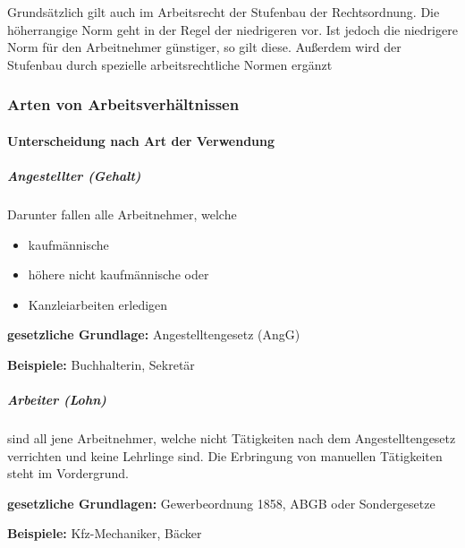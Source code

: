 \documentclass{htblagkr}
\begin{document}
    Grundsätzlich gilt auch im Arbeitsrecht der Stufenbau der Rechtsordnung.
    Die höherrangige Norm geht in der Regel der niedrigeren vor.
    Ist jedoch die niedrigere Norm für den Arbeitnehmer günstiger, so gilt diese.
    Außerdem wird der Stufenbau durch spezielle arbeitsrechtliche Normen ergänzt

    \subsubsection{Arten von Arbeitsverhältnissen}

    \paragraph{Unterscheidung nach Art der Verwendung}

    \subparagraph{Angestellter (Gehalt)}

    Darunter fallen alle Arbeitnehmer, welche

    \begin{itemize}
        \item{kaufmännische}
        \item{höhere nicht kaufmännische oder}
        \item{Kanzleiarbeiten erledigen}
    \end{itemize}

    \textbf{gesetzliche Grundlage:} Angestelltengesetz (AngG)

    \textbf{Beispiele:} Buchhalterin, Sekretär

    \subparagraph{Arbeiter (Lohn)}

    sind all jene Arbeitnehmer, welche nicht Tätigkeiten nach dem Angestelltengesetz verrichten und keine Lehrlinge sind.
    Die Erbringung von manuellen Tätigkeiten steht im Vordergrund.

    \textbf{gesetzliche Grundlagen:} Gewerbeordnung 1858, ABGB oder Sondergesetze

    \textbf{Beispiele:} Kfz-Mechaniker, Bäcker

    \clearpage

    \listoffigures

    \clearpage

    \printabbreviations

    \clearpage

    \printglossary
\end{document}
